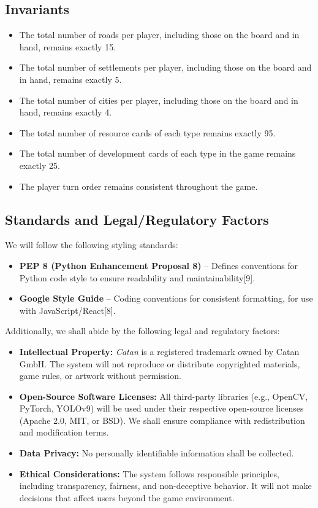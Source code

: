 \documentclass{article}
\begin{document}
\subsection{Invariants}\label{subsec:invariants}
\begin{itemize}
    \item The total number of roads per player, including those on the board and in hand, remains exactly 15.
    \item The total number of settlements per player, including those on the board and in hand, remains exactly 5.
    \item The total number of cities per player, including those on the board and in hand, remains exactly 4.
    \item The total number of resource cards of each type remains exactly 95.
    \item The total number of development cards of each type in the game remains exactly 25.
    \item The player turn order remains consistent throughout the game.
\end{itemize}


\subsection{Standards and Legal/Regulatory Factors}
We will follow the following styling standards:
\begin{itemize}
    \item \textbf{PEP 8 (Python Enhancement Proposal 8)} – Defines conventions for Python code style to ensure readability and maintainability[9].
    \item \textbf{Google Style Guide} – Coding conventions for consistent formatting, for use with JavaScript/React[8].
\end{itemize}

Additionally, we shall abide by the following legal and regulatory factors:
\begin{itemize}
    \item \textbf{Intellectual Property:}
    \emph{Catan} is a registered trademark owned by Catan GmbH. The system will not reproduce or distribute copyrighted materials, game rules, or artwork without permission.

    \item \textbf{Open-Source Software Licenses:}
    All third-party libraries (e.g., OpenCV, PyTorch, YOLOv9) will be used under their respective open-source licenses (Apache 2.0, MIT, or BSD). We shall ensure compliance with redistribution and modification terms.

    \item \textbf{Data Privacy:}
    No personally identifiable information shall be collected.

    \item \textbf{Ethical \AI{} Considerations:}
    The system follows responsible \AI{} principles, including transparency, fairness, and non-deceptive behavior. It will not make decisions that affect users beyond the game environment.
\end{itemize}
\end{document}
